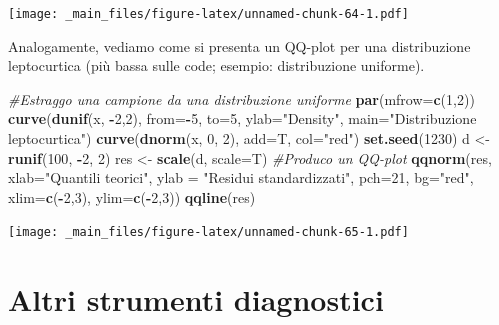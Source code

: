 \documentclass[a4paper,12pt,oneside]{book}
\newenvironment{Shaded}{\begin{snugshade}}{\end{snugshade}}
\newcommand{\KeywordTok}[1]{\textcolor[rgb]{0.13,0.29,0.53}{\textbf{#1}}}
\newcommand{\DataTypeTok}[1]{\textcolor[rgb]{0.13,0.29,0.53}{#1}}
\newcommand{\DecValTok}[1]{\textcolor[rgb]{0.00,0.00,0.81}{#1}}
\newcommand{\StringTok}[1]{\textcolor[rgb]{0.31,0.60,0.02}{#1}}
\newcommand{\CommentTok}[1]{\textcolor[rgb]{0.56,0.35,0.01}{\textit{#1}}}
\newcommand{\OperatorTok}[1]{\textcolor[rgb]{0.81,0.36,0.00}{\textbf{#1}}}
\newcommand{\NormalTok}[1]{#1}
\theoremstyle{definition}
\theoremstyle{definition}
\theoremstyle{definition}
\theoremstyle{remark}
\begin{document}
\texttt{[image: \_main\_files/figure-latex/unnamed-chunk-64-1.pdf]}

Analogamente, vediamo come si presenta un QQ-plot per una distribuzione
leptocurtica (più bassa sulle code; esempio: distribuzione uniforme).

\begin{Shaded}
\begin{Highlighting}[]
\CommentTok{#Estraggo una campione da una distribuzione uniforme}
\KeywordTok{par}\NormalTok{(}\DataTypeTok{mfrow=}\KeywordTok{c}\NormalTok{(}\DecValTok{1}\NormalTok{,}\DecValTok{2}\NormalTok{))}
\KeywordTok{curve}\NormalTok{(}\KeywordTok{dunif}\NormalTok{(x, }\OperatorTok{-}\DecValTok{2}\NormalTok{,}\DecValTok{2}\NormalTok{), }\DataTypeTok{from=}\OperatorTok{-}\DecValTok{5}\NormalTok{, }\DataTypeTok{to=}\DecValTok{5}\NormalTok{, }\DataTypeTok{ylab=}\StringTok{"Density"}\NormalTok{, }\DataTypeTok{main=}\StringTok{"Distribuzione leptocurtica"}\NormalTok{)}
\KeywordTok{curve}\NormalTok{(}\KeywordTok{dnorm}\NormalTok{(x, }\DecValTok{0}\NormalTok{, }\DecValTok{2}\NormalTok{), }\DataTypeTok{add=}\NormalTok{T, }\DataTypeTok{col=}\StringTok{"red"}\NormalTok{)}
\KeywordTok{set.seed}\NormalTok{(}\DecValTok{1230}\NormalTok{)}
\NormalTok{d <-}\StringTok{ }\KeywordTok{runif}\NormalTok{(}\DecValTok{100}\NormalTok{, }\OperatorTok{-}\DecValTok{2}\NormalTok{, }\DecValTok{2}\NormalTok{)}
\NormalTok{res <-}\StringTok{ }\KeywordTok{scale}\NormalTok{(d, }\DataTypeTok{scale=}\NormalTok{T)}
\CommentTok{#Produco un QQ-plot}
\KeywordTok{qqnorm}\NormalTok{(res, }\DataTypeTok{xlab=}\StringTok{"Quantili teorici"}\NormalTok{, }
     \DataTypeTok{ylab =} \StringTok{"Residui  standardizzati"}\NormalTok{, }
     \DataTypeTok{pch=}\DecValTok{21}\NormalTok{, }\DataTypeTok{bg=}\StringTok{"red"}\NormalTok{, }\DataTypeTok{xlim=}\KeywordTok{c}\NormalTok{(}\OperatorTok{-}\DecValTok{2}\NormalTok{,}\DecValTok{3}\NormalTok{), }\DataTypeTok{ylim=}\KeywordTok{c}\NormalTok{(}\OperatorTok{-}\DecValTok{2}\NormalTok{,}\DecValTok{3}\NormalTok{))}
\KeywordTok{qqline}\NormalTok{(res)}
\end{Highlighting}
\end{Shaded}

\texttt{[image: \_main\_files/figure-latex/unnamed-chunk-65-1.pdf]}

\section{Altri strumenti diagnostici}\label{altri-strumenti-diagnostici}
\end{document}
